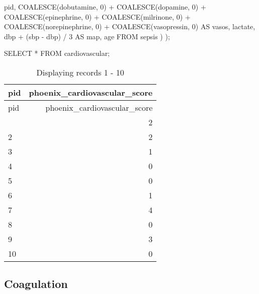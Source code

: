 \documentclass[
  letterpaper,
  DIV=11,
  numbers=noendperiod]{scrartcl}
\newenvironment{Shaded}{\begin{snugshade}}{\end{snugshade}}
\newcommand{\DecValTok}[1]{\textcolor[rgb]{0.68,0.00,0.00}{#1}}
\newcommand{\FunctionTok}[1]{\textcolor[rgb]{0.28,0.35,0.67}{#1}}
\newcommand{\KeywordTok}[1]{\textcolor[rgb]{0.00,0.23,0.31}{#1}}
\newcommand{\NormalTok}[1]{\textcolor[rgb]{0.00,0.23,0.31}{#1}}
\newcommand{\OperatorTok}[1]{\textcolor[rgb]{0.37,0.37,0.37}{#1}}
\begin{document}
\begin{Shaded}
\begin{Highlighting}[]
\NormalTok{      pid,}
      \FunctionTok{COALESCE}\NormalTok{(dobutamine, }\DecValTok{0}\NormalTok{) }\OperatorTok{+}
        \FunctionTok{COALESCE}\NormalTok{(dopamine, }\DecValTok{0}\NormalTok{) }\OperatorTok{+}
        \FunctionTok{COALESCE}\NormalTok{(epinephrine, }\DecValTok{0}\NormalTok{) }\OperatorTok{+}
        \FunctionTok{COALESCE}\NormalTok{(milrinone, }\DecValTok{0}\NormalTok{) }\OperatorTok{+}
        \FunctionTok{COALESCE}\NormalTok{(norepinephrine, }\DecValTok{0}\NormalTok{) }\OperatorTok{+}
        \FunctionTok{COALESCE}\NormalTok{(vasopressin, }\DecValTok{0}\NormalTok{) }\KeywordTok{AS}\NormalTok{ vasos,}
\NormalTok{      lactate,}
\NormalTok{      dbp }\OperatorTok{+}\NormalTok{ (sbp }\OperatorTok{{-}}\NormalTok{ dbp) }\OperatorTok{/} \DecValTok{3} \KeywordTok{AS}\NormalTok{ map,}
\NormalTok{      age}
    \KeywordTok{FROM}\NormalTok{ sepsis}
\NormalTok{  )}
\NormalTok{);}
\end{Highlighting}
\end{Shaded}

\begin{Shaded}
\begin{Highlighting}[]
\KeywordTok{SELECT} \OperatorTok{*} \KeywordTok{FROM}\NormalTok{ cardiovascular;}
\end{Highlighting}
\end{Shaded}

\begin{longtable}[]{@{}lr@{}}
\caption{Displaying records 1 - 10}\tabularnewline
\toprule\noalign{}
pid & phoenix\_cardiovascular\_score \\
\midrule\noalign{}
\endfirsthead
\toprule\noalign{}
pid & phoenix\_cardiovascular\_score \\
\midrule\noalign{}
\endhead
\bottomrule\noalign{}
\endlastfoot
1 & 2 \\
2 & 2 \\
3 & 1 \\
4 & 0 \\
5 & 0 \\
6 & 1 \\
7 & 4 \\
8 & 0 \\
9 & 3 \\
10 & 0 \\
\end{longtable}

\subsection{Coagulation}\label{coagulation}
\end{document}
